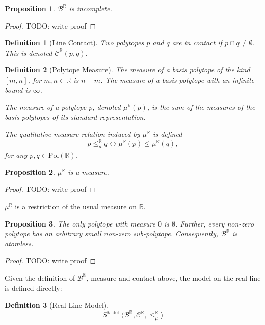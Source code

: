 \documentclass{article}
\newtheorem*{definition}{Definition}
\newtheorem*{proposition}{Proposition}
\newcommand{\R}{\mathbb{R}}
\newcommand{\B}{\mathcal{B}}
\newcommand{\bcont}{\mathcal{C}^\R}
\newcommand{\bmeasure}{\leq_\mu^\R}
\newcommand{\Pol}{\text{Pol}}
\newcommand{\eqdef}{\stackrel{\text{def}}{=}}
\begin{document}
\begin{proposition}
  $\B^\R$ is incomplete.
\end{proposition}
\begin{proof}
  TODO: write proof
\end{proof}

\begin{definition}[Line Contact]
Two polytopes $p$ and $q$ are \emph{in contact} if $p \cap q \neq \emptyset$. This is denoted $\bcont(p, q)$.
\end{definition}

\begin{definition}[Polytope Measure]
  The measure of a basis polytope of the kind $[m, n]$, for $m, n \in \R$ is $n-m$. The measure of a basis polytope with an infinite bound is $\infty$.

  The \emph{measure} of a polytope $p$, denoted $\mu^\R(p)$, is the sum of the measures of the basis polytopes of its standard representation.

The \emph{qualitative measure relation induced by} $\mu^\R$ is defined
\begin{equation*}
  p \bmeasure q \leftrightarrow \mu^\R(p) \leq \mu^\R(q),
\end{equation*}
  for any $p, q \in \Pol(\R)$.
\end{definition}

\begin{proposition}
  $\mu^\R$ is a measure.
\end{proposition}
\begin{proof}
  TODO: write proof
\end{proof}

$\mu^\R$ is a restriction of the usual measure on $\R$.

\begin{proposition}
The only polytope with measure $0$ is $\emptyset$. Further, every non-zero polytope has an arbitrary small non-zero sub-polytope. Consequently, $\B^\R$ is atomless.
\end{proposition}
\begin{proof}
  TODO: write proof
\end{proof}

Given the definition of $\B^\R$, measure and contact above, the model on the real line is defined directly:

\begin{definition}[Real Line Model]
  \begin{equation*}
    S^\R \eqdef \langle \B^\R, \bcont, \bmeasure \rangle
  \end{equation*}
\end{definition}
\end{document}
